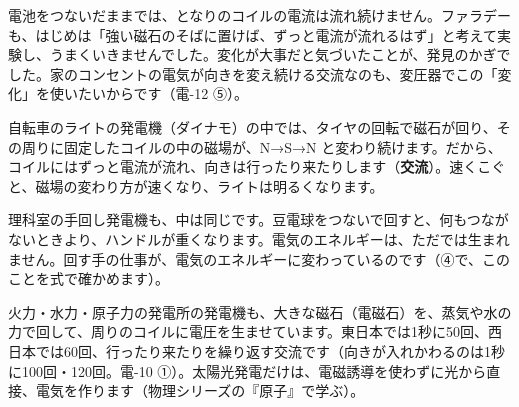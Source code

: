 \begin{phmijika}
電池をつないだままでは、となりのコイルの電流は流れ続けません。ファラデーも、はじめは「強い磁石のそばに置けば、ずっと電流が流れるはず」と考えて実験し、うまくいきませんでした。変化が大事だと気づいたことが、発見のかぎでした。家のコンセントの電気が向きを変え続ける交流なのも、変圧器でこの「変化」を使いたいからです（電-12 ⑤）。
\end{phmijika}

\label{ph:電-8:sec2}
\noindent\begin{minipage}[c]{0.62\linewidth}\raggedright
自転車のライトの発電機（ダイナモ）の中では、タイヤの回転で磁石が回り、その周りに固定したコイルの中の磁場が、N→S→N と変わり続けます。だから、コイルにはずっと電流が流れ、向きは行ったり来たりします（\textbf{交流}）。速くこぐと、磁場の変わり方が速くなり、ライトは明るくなります。
\end{minipage}\hfill
\begin{minipage}[c]{0.35\linewidth}\centering
{}
\end{minipage}
\par\vspace{3pt}
理科室の手回し発電機も、中は同じです。豆電球をつないで回すと、何もつながないときより、ハンドルが重くなります。電気のエネルギーは、ただでは生まれません。回す手の仕事が、電気のエネルギーに変わっているのです（④で、このことを式で確かめます）。

\begin{phmijika}
火力・水力・原子力の発電所の発電機も、大きな磁石（電磁石）を、蒸気や水の力で回して、周りのコイルに電圧を生ませています。東日本では1秒に50回、西日本では60回、行ったり来たりを繰り返す交流です（向きが入れかわるのは1秒に100回・120回。電-10 ①）。太陽光発電だけは、電磁誘導を使わずに光から直接、電気を作ります（物理シリーズの『原子』で学ぶ）。
\end{phmijika}

